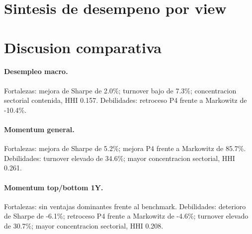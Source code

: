 \documentclass[11pt]{article}
\begin{document}
\section{Sintesis de desempeno por view}

\begin{table}[H]
\centering
{}
\caption{Resumen agregado de desempeno de Black--Litterman calibrado por view.}
\label{tab:resumen_views_v1_plus}
\end{table}


\section{Discusion comparativa}

\paragraph{Desempleo macro.} Fortalezas: mejora de Sharpe de 2.0\%; turnover bajo de 7.3\%; concentracion sectorial contenida, HHI 0.157. Debilidades: retroceso P4 frente a Markowitz de -10.4\%.

\paragraph{Momentum general.} Fortalezas: mejora de Sharpe de 5.2\%; mejora P4 frente a Markowitz de 85.7\%. Debilidades: turnover elevado de 34.6\%; mayor concentracion sectorial, HHI 0.261.

\paragraph{Momentum top/bottom 1Y.} Fortalezas: sin ventajas dominantes frente al benchmark. Debilidades: deterioro de Sharpe de -6.1\%; retroceso P4 frente a Markowitz de -4.6\%; turnover elevado de 30.7\%; mayor concentracion sectorial, HHI 0.208.
\end{document}
